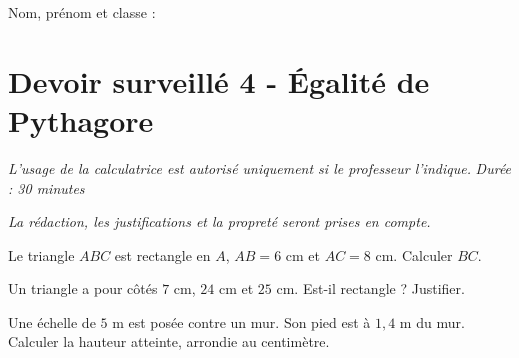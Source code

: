\documentclass[a4paper,10pt]{report}
\begin{document}
\pagestyle{empty}
\noindent Nom, prénom et classe : \dotfill

\section*{Devoir surveillé 4 - Égalité de Pythagore}

\noindent \textit{L'usage de la calculatrice est autorisé uniquement si le professeur l'indique.} \hfill \textit{Durée : 30 minutes}

\medskip
\noindent \textit{La rédaction, les justifications et la propreté seront prises en compte.}


\begin{ex}[Calculer]
Le triangle $ABC$ est rectangle en $A$, $AB=6$ cm et $AC=8$ cm. Calculer $BC$.
\medskip\noindent\grandscarreaux{\linewidth}{4cm}
\end{ex}
\begin{ex}[Tester]
Un triangle a pour côtés $7$ cm, $24$ cm et $25$ cm. Est-il rectangle ? Justifier.
\medskip\noindent\grandscarreaux{\linewidth}{4cm}
\end{ex}
\begin{ex}[Problème]
Une échelle de $5$ m est posée contre un mur. Son pied est à $1,4$ m du mur. Calculer la hauteur atteinte, arrondie au centimètre.
\medskip\noindent\grandscarreaux{\linewidth}{5cm}
\end{ex}
\end{document}
